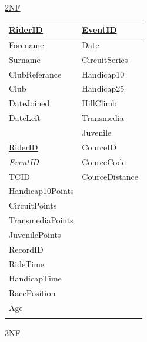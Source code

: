 \underline{2NF}

\begin{tabular}{|l|l|}
\hline
\underline{RiderID} & \underline{EventID} \\ \hline
Forename            & Date                \\ \hline
Surname             & CircuitSeries       \\ \hline
ClubReferance       & Handicap10          \\ \hline
Club                & Handicap25          \\ \hline
DateJoined          & HillClimb           \\ \hline
DateLeft            & Transmedia          \\ \hline
                    & Juvenile            \\ \hline
\underline{RiderID} & CourceID            \\ \hline
\emph{EventID}      & CourceCode          \\ \hline 
TCID                & CourceDistance      \\ \hline 
Handicap10Points    &                     \\ \hline
CircuitPoints       &                     \\ \hline 
TransmediaPoints    &                     \\ \hline
JuvenilePoints      &                     \\ \hline
RecordID            &                     \\ \hline
RideTime            &                     \\ \hline
HandicapTime        &                     \\ \hline
RacePosition        &                     \\ \hline
Age                 &                     \\ \hline
                    &                     \\ \hline
\end{tabular}

\underline{3NF}

